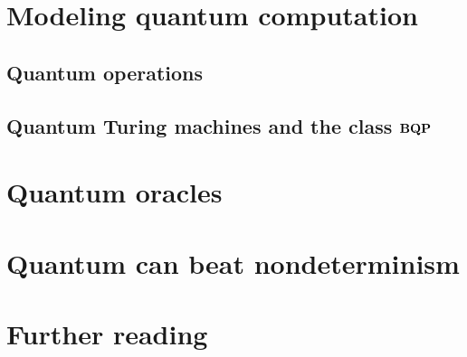 \documentclass[12pt]{article}
\begin{document}
\section{Modeling quantum computation}


\subsection{Quantum operations}

\subsection{Quantum Turing machines and the class $\mathbf{BQP}$}



\section{Quantum oracles}


\section{Quantum can beat nondeterminism \cite{BB92}}


\section{Further reading}


\nocite{*}


\end{document}
